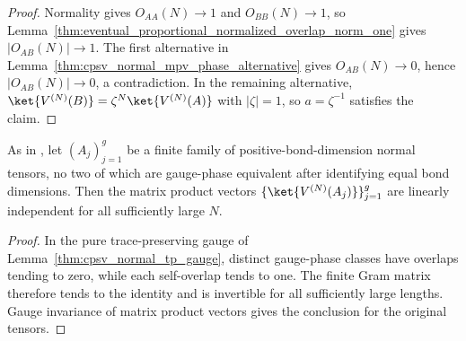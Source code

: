 \begin{proof}\leanok
    Normality gives $O_{AA}(N)\to1$ and $O_{BB}(N)\to1$, so
    Lemma~\ref{thm:eventual_proportional_normalized_overlap_norm_one} gives
    $|O_{AB}(N)|\to1$. The first alternative in
    Lemma~\ref{thm:cpsv_normal_mpv_phase_alternative} gives
    $O_{AB}(N)\to0$, hence $|O_{AB}(N)|\to0$, a contradiction. In the
    remaining alternative,
    $\ket{V^{(N)}(B)}=\zeta^N\ket{V^{(N)}(A)}$ with $|\zeta|=1$, so
    $a=\zeta^{-1}$ satisfies the claim.
\end{proof}

\begin{lemma}
    \label{thm:cpsv_normal_separated_eventually_li}
    \leanok
    As in \cite[Appendix~A]{Cirac2016MPDO_arXiv}, let $(A_j)_{j=1}^g$ be a
    finite family of positive-bond-dimension normal tensors, no two of which
    are gauge-phase equivalent after identifying equal bond dimensions. Then
    the matrix product vectors $\{\ket{V^{(N)}(A_j)}\}_{j=1}^g$ are linearly
    independent for all sufficiently large $N$.
\end{lemma}

\begin{proof}\leanok
    In the pure trace-preserving gauge of
    Lemma~\ref{thm:cpsv_normal_tp_gauge}, distinct gauge-phase classes have
    overlaps tending to zero, while each self-overlap tends to one. The finite
    Gram matrix therefore tends to the identity and is invertible for all
    sufficiently large lengths. Gauge invariance of matrix product vectors
    gives the conclusion for the original tensors.
\end{proof}
